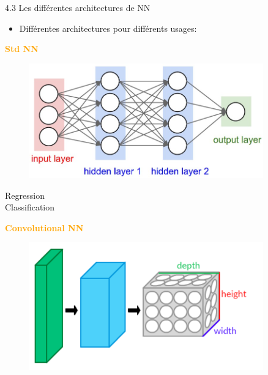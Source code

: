 \begin{frame}{4.3 Les différentes architectures de NN}
  \begin{itemize}
  \item Différentes architectures pour différents usages:
  \end{itemize}
  \vspace{0.5cm}
  \footnotesize
  \begin{minipage}{.3\textwidth}
    \begin{center}
      \textbf{\textcolor{orange}{Std NN}}
    \end{center}
    \begin{figure}
      \includegraphics[width=0.9\textwidth,height=0.2\textheight]{fig/threelayerNN.jpg}
    \end{figure}
    Regression\\
    Classification\\
  \end{minipage} 
  \begin{minipage}{.3\textwidth}
    \begin{center}
      \textbf{\textcolor{orange}{Convolutional NN}}
    \end{center}
    \begin{figure}
      \includegraphics[width=0.9\textwidth,height=0.2\textheight]{fig/CNN.png}
    \end{figure}

\end{minipage}
\end{frame}
